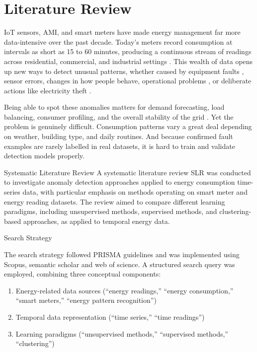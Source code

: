 ﻿\documentclass[12pt,reqno, twoside]{amsbook}
\makeatletter
\numberwithin{figure}{chapter}
\numberwithin{table}{chapter}
\numberwithin{equation}{chapter}
\def\section{\@startsection{section}{1}%
      \z@{.5\linespacing\@plus.7\linespacing}{.25\linespacing}%
      {\normalfont\bfseries\flushleft}}
\def\subsection{\@startsection{subsection}{2}%
      \z@{.5\linespacing\@plus.7\linespacing}{.25\linespacing}%
      {\normalfont\bfseries\flushleft}}
\theoremstyle{plain}
\numberwithin{equation}{chapter}
\numberwithin{section}{chapter}
\makeatother
\begin{document}
\chapter{Literature Review}
\label{chapter:LitReview}
\noindent
\ac{IoT} sensors, \ac{AMI}, and smart meters have made energy management far more data-intensive over the past decade. Today's meters record consumption at intervals as short as 15 to 60 minutes, producing a continuous stream of readings across residential, commercial, and industrial settings \cite{himeur_artificial_2021}. This wealth of data opens up new ways to detect unusual patterns, whether caused by equipment faults \cite{gaur_performance_2019}, sensor errors, changes in how people behave, operational problems \cite{turowski_enhancing_2022}, or deliberate actions like electricity theft \cite{liu_unsupervised_2024}.

Being able to spot these anomalies matters for demand forecasting, load balancing, consumer profiling, and the overall stability of the grid \cite{m_z_h_unsupervised_2021}. Yet the problem is genuinely difficult. Consumption patterns vary a great deal depending on weather, building type, and daily routines. And because confirmed fault examples are rarely labelled in real datasets, it is hard to train and validate detection models properly.

\par

\section{Systematic Literature Review}
\label{section:SLR}
A systematic literature review \ac{SLR} was conducted to investigate anomaly detection approaches applied to energy consumption time-series data, with particular emphasis on methods operating on smart meter and energy reading datasets. The review aimed to compare different learning paradigms, including unsupervised methods, supervised methods, and clustering-based approaches, as applied to temporal energy data.

\subsection{Search Strategy}

The search strategy followed \ac{PRISMA} guidelines and was implemented using Scopus, semantic scholar and web of science. A structured search query was employed, combining three conceptual components:
\begin{enumerate}[label=(\roman*)]
    \item Energy-related data sources (``energy readings,'' ``energy consumption,'' ``smart meters,'' ``energy pattern recognition'')
    \item Temporal data representation (``time series,'' ``time readings'')
    \item Learning paradigms (``unsupervised methods,'' ``supervised methods,'' ``clustering'')
\end{enumerate}
\end{document}
